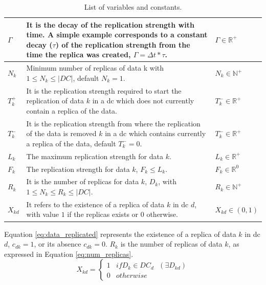 \documentclass[english]{article}
\begin{document}
\begin{table}[ht!]
\begin{tabular}{ |l|p{7.8cm}|l|}
		\hline
		$\Gamma$      & It is the decay of the replication strength with time. A simple example corresponds to a constant decay ($\tau$) of the replication strength from the time the replica was created, $\Gamma = \Delta t * \tau$. & $\Gamma \in \mathbb{R}^{+}$ \\
		\hline
		$N_{k}$           & Minimum number of replicas of data k with $1 \le N_{k} \le |DC|$, default $N_{k} = 1$. & $N_{k} \in \mathbb{N}^{+}$ \\
		\hline
		$T^{+}_{k}$       & It is the replication strength required to start the replication of data $k$ in a \gls{dc} which does not currently contain a replica of the data. & $T^{-}_{k} \in \mathbb{R}^{+}$ \\
		\hline
		$T^{-}_{k}$       & It is the replication strength from where the replication of the data is removed $k$ in a \gls{dc} which contains currently a replica of the data, default $T^{-}_{k} = 0$. & $T^{-}_{k} \in \mathbb{R}^{+}$ \\
		\hline
		$L_{k}$            & The maximum replication strength for data $k$. & $L_{k} \in \mathbb{R}^{+}$ \\
		\hline
		$F_{k}$            & The replication strength for data $k$, $F_{k} \le L_{k}$. & $F_{k} \in \mathbb{R}^{0}$ \\
		\hline
		$R_{k}$            & It is the number of replicas for data $k$, $D_{k}$, with $1 \le N_{k} \le R_{k} \le |DC|$. & $R_{k} \in \mathbb{N}^{+}$ \\
		\hline
		$X_{kd}$            & It refers to the existence of a replica of data $k$ in \gls{dc} $d$, with value $1$ if the replicas exists or $0$ otherwise. & $X_{kd} \in (0, 1)$\\
		\hline
	\end{tabular}
	
	\caption{List of variables and constants.}
	\label{tbl:vars_consts}
\end{table}

Equation \ref{eq:data_replicated} represents the existence of a replica of data $k$ in \gls{dc} $d$, $c_{dk} = 1$, or its absence $c_{dk} = 0$. $R_{k}$ is the number of replicas of data $k$, as expressed in Equation \ref{eq:num_replicas}.
\begin{equation} \label{eq:data_replicated}
	X_{kd} = \left\{
		\begin{array}{ll}
			1 & if D_{k} \in DC_{d} \text{ } (\exists D_{kd})\\
			0 & otherwise
		\end{array}
	\right.
\end{equation}
\end{document}
